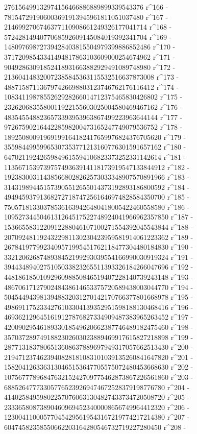        276156499132974156466886889899339543376 r^166 - 
       781547291906003691913945961811051037480 r^167 - 
       2146992706746377110908661249326177041714 r^168 - 
       5724281494077068592609145084019392341704 r^169 - 
       14809769872739428403815504979399886852486 r^170 - 
       37172098543341494817863103609000254674962 r^171 - 
       90492863091852418931663882929491089748980 r^172 - 
       213604148320072385845363115532516637873008 r^173 - 
       488715871136797426698803123746762176116412 r^174 - 
       1083411987855262928266014712375465830426802 r^175 - 
       2326206835580011922155603025004580469467162 r^176 - 
       4835455488236573393953963867499223963644144 r^177 - 
       9726759021644228598200473165247749079536752 r^178 - 
       18925080091969199164182417659976824376705620 r^179 - 
       35598449959965307353771213160776301591657162 r^180 - 
       64702119242659849615594106823373252331142614 r^181 - 
       113567153973975749363914118173919547133844912 r^182 - 
       192383003114385668028262573033348907570891966 r^183 - 
       314319894451573905512655014373192893186800592 r^184 - 
       494945937913682727187472561646974828584350700 r^185 - 
       750571813303785361639426480418005422460558580 r^186 - 
       1095273445046131264517522748924041966962357850 r^187 - 
       1536655831220912288046107100271554392045543844 r^188 - 
       2070924811924322981130230423959581914061223362 r^189 - 
       2678419779923409571995451762118477304480184830 r^190 - 
       3321206268748938452199293039554166990030919324 r^191 - 
       3944348940275105033823265511393326184266047696 r^192 - 
       4481861850109296098850846519407228140739243148 r^193 - 
       4867061712790248438614653375720589438003044770 r^194 - 
       5045449439813948832031270142170766377801668978 r^195 - 
       4986911752334276103304139352951598188130468416 r^196 - 
       4693621296451619127876827334909487383965263452 r^197 - 
       4200902954618933018549620662387746489182475460 r^198 - 
       3570372897491882302603023889469917615827218898 r^199 - 
       2877131837806513608637889697949317057662513430 r^200 - 
       2194712374623940828181083101039135260841647820 r^201 - 
       1582041263363130465153647705575072480453668630 r^202 - 
       1075677789684763215242709775462873867226561860 r^203 - 
       688526477733057765239269474672528379198776780 r^204 - 
       414025849598022570760631304827433734720508720 r^205 - 
       233365808738904609694523400008656749964412320 r^206 - 
       123004110005770454295619543167219774217214380 r^207 - 
       60474582358550662203164280546732719227280450 r^208 - 
